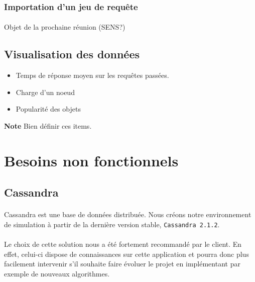 \documentclass[12pt]{article}
\begin{document}
\subsubsection{Importation d'un jeu de requête}

\paragraph{} Objet de la prochaine réunion (SENS?)


\subsection{Visualisation des données}

\begin{itemize}
 \item Temps de réponse moyen sur les requêtes passées.
 \item Charge d'un noeud
 \item Popularité des objets
\end{itemize}

\textbf{Note } Bien définir ces items. \newline



\newpage

\section{Besoins non fonctionnels}

\subsection{Cassandra}

\paragraph{} Cassandra est une base de données distribuée.
Nous créons notre environnement de simulation à partir de la dernière version stable, \texttt{Cassandra 2.1.2}.

\paragraph{} Le choix de cette solution nous a été fortement recommandé par le client.
En effet, celui-ci dispose de connaissances sur cette application et pourra donc plus facilement intervenir s'il souhaite faire évoluer le projet en implémentant par exemple de nouveaux algorithmes.
\end{document}
